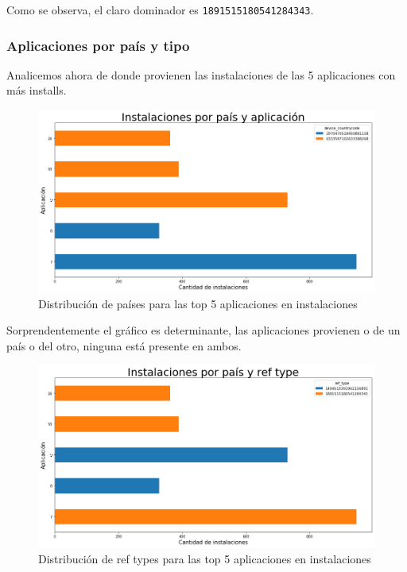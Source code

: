 \documentclass[a4paper, 12pt]{article}
\begin{document}
		Como se observa, el claro dominador es \texttt{1891515180541284343}.
		
	\subsubsection{Aplicaciones por país y tipo}
	
		Analicemos ahora de donde provienen las instalaciones de las 5 aplicaciones con más installs.
	
		\FloatBarrier
		\begin{figure}[h]
			\centering
			\includegraphics[width=\textwidth]{images/installs/appsxpais.png}
			\caption{Distribución de países para las top 5 aplicaciones en instalaciones}
		\end{figure}
		\FloatBarrier
		
		Sorprendentemente el gráfico es determinante, las aplicaciones provienen o de un país o del otro, ninguna está presente en ambos.
		
		\FloatBarrier
		\begin{figure}[h]
			\centering
			\includegraphics[width=\textwidth]{images/installs/paisref.png}
			\caption{Distribución de ref types para las top 5 aplicaciones en instalaciones}
		\end{figure}
		\FloatBarrier
		
\end{document}
